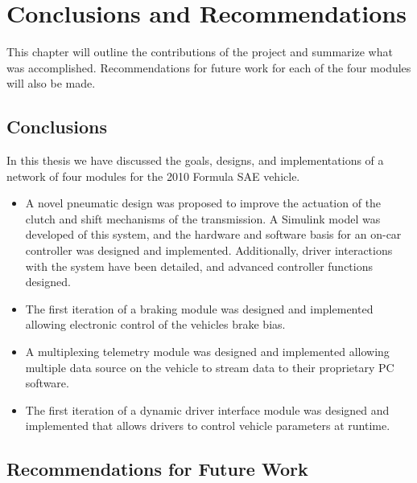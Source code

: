 
\chapter{Conclusions and Recommendations}
\label{cha:conclusions}

This chapter will outline the contributions of the project and summarize what was accomplished. Recommendations for future work for each of the four modules will also be made.

\section{Conclusions}

In this thesis we have discussed the goals, designs, and implementations of a network of four modules for the 2010 Formula SAE vehicle.

\begin{itemize}

  \item A novel pneumatic design was proposed to improve the actuation of the clutch and shift mechanisms of the transmission. A Simulink model was developed of this system, and the hardware and software basis for an on-car controller was designed and implemented. Additionally, driver interactions with the system have been detailed, and advanced controller functions designed.

  \item The first iteration of a braking module was designed and implemented allowing electronic control of the vehicles brake bias.

  \item A multiplexing telemetry module was designed and implemented allowing multiple data source on the vehicle to stream data to their proprietary PC software.

  \item The first iteration of a dynamic driver interface module was designed and implemented that allows drivers to control vehicle parameters at runtime.
  
\end{itemize}

\section{Recommendations for Future Work}


